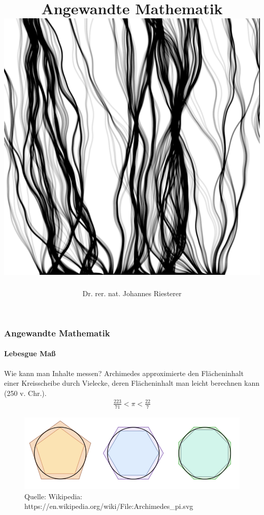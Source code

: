 \documentclass{beamer}
\begin{document}
\title[Angewandte Mathematik] %
{Angewandte Mathematik
\\
\includegraphics[scale=0.15]{images/cover}
}
\subtitle{}
\author[Dr. Johannes Riesterer] %
{Dr.  rer. nat. Johannes Riesterer}

\date[KPT 2004] %
{}

\subject{Angewandte Mathematik}



\frame{\titlepage}

\begin{frame}
    \frametitle{Angewandte Mathematik}
\framesubtitle{Lebesgue Maß}
    \begin{block}{Wie kann man Inhalte messen?}
Archimedes approximierte den Flächeninhalt einer Kreisscheibe durch Vielecke, deren Flächeninhalt man leicht berechnen kann (250 v. Chr.).
\begin{align*}
\frac{223}{71} < \pi < \frac{22}{7}
\end{align*}
\begin{figure}[H]
      \centering
    \includegraphics[width=0.7 \textwidth]{images/750px-Archimedes_pi}
      \caption{Quelle: Wikipedia: https://en.wikipedia.org/wiki/File:Archimedes\_pi.svg}
\end{figure}
\end{block}
 \end{frame}
\end{document}
